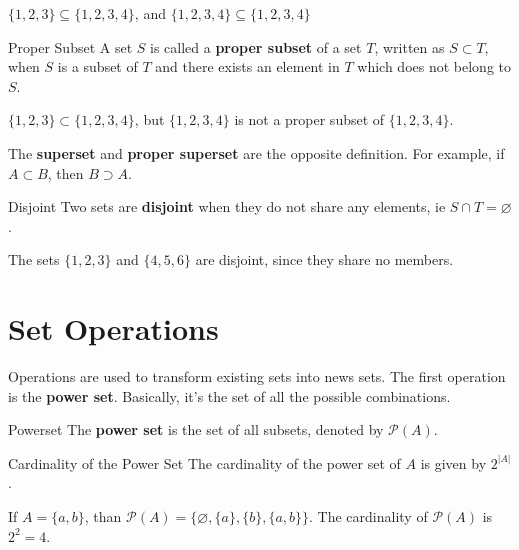 \begin{boxexample}{}{}
	$\{1,2,3\} \subseteq \{1,2,3,4\}$, and $\{1,2,3,4\} \subseteq \{1,2,3,4\}$
\end{boxexample}

\begin{boxdefine}{Proper Subset}{}
	A set $S$ is called a {\bf proper subset} of a set $T$, written as $S \subset T$, when $S$ is a subset of $T$ and there exists an element in $T$ which does not belong to $S$.
\end{boxdefine}

\begin{boxexample}{}{}
	$\{1,2,3\} \subset \{1,2,3,4\}$, but $\{1,2,3,4\}$ is not a proper subset of $\{1,2,3,4\}$.
\end{boxexample}

The {\bf superset} and {\bf proper superset} are the opposite definition. For example, if $A \subset B$, then $B \supset A$.

\begin{boxdefine}{Disjoint}{}
	Two sets are {\bf disjoint} when they do not share any elements, ie $S \cap T=\varnothing$.
\end{boxdefine}

\begin{boxexample}{}{}
	The sets $\{1,2,3\}$ and $\{4,5,6\}$ are disjoint, since they share no members.
\end{boxexample}

\section{Set Operations}

Operations are used to transform existing sets into news sets.  The first operation is the {\bf power set}. Basically, it's the set of all the possible combinations.

\begin{boxdefine}{Powerset}{}
	The {\bf power set} is the set of all subsets, denoted by $\mathcal{P}(A)$.
\end{boxdefine}

\begin{boxproposition}{Cardinality of the Power Set}{}
	The cardinality of the power set of $A$ is given by $2^{|A|}$.
\end{boxproposition}

\begin{boxexample}{}{}
	If $A=\{a,b\}$, than $\mathcal{P}(A) = \{\varnothing,\{a\},\{b\},\{a,b\}\}$. The cardinality of $\mathcal{P}(A)$ is $2^{2}=4$.
\end{boxexample}


